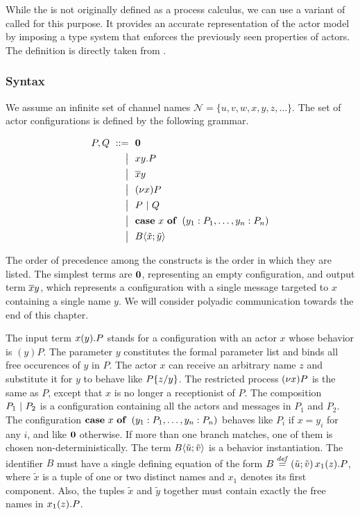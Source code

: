 While the \actormodel is not originally defined as a process calculus,
we can use a variant of \picalc called \actorpicalc for this purpose.
It provides an accurate representation of the actor model
by imposing a type system that enforces the previously seen properties of actors.
The definition is directly taken from \cite{agha_algebraic_2004}.

\subsubsection{Syntax}

We assume an infinite set of channel names
$ \mathcal{N} = \{u, v, w, x, y, z, \ldots\} $.
The set of actor configurations is defined by the following grammar.

\begin{align*}
  P, Q
  \grmr \anullproc
  \altn \amrcv{x}{y} . P
  \altn \amsnd{x}{y}
  \altn \anew{x}{P}
  \altn P \apar Q
  \altn \acse{x}{\aalt{y_1}{P_1}, \dots, \aalt{y_n}{P_n}}
  \altn \ains{B}{\tilde{x}}{\tilde{y}}
\end{align*}

The order of precedence among the constructs is the order in which they are
listed.
The simplest terms are $\textbf{\textup{0}}$, representing an empty configuration,
and output term $\overline{x} y$, which represents a configuration with a single message
targeted to $x$ containing a single name $y$. %
We will consider polyadic communication towards the end of this chapter.

The input term $x(y) . P$ stands for a configuration with an actor
$x$ whose behavior is $(y) P$.
The parameter $y$ constitutes the formal parameter list and binds all
free occurences of $y$ in $P$.
The actor $x$ can receive an arbitrary name $z$
and substitute it for $y$ to behave like $P \{ z / y \}$.
The restricted process $\anew{x}{P}$ is the same as $P$,
except that $x$ is no longer a receptionist of $P$.
The composition $P_1 \ |\  P_2$ is a configuration containing
all the actors and messages in $P_1$ and $P_2$.
The configuration
$\acse{x}{\aalt{y_1}{P_1}, \ldots, \aalt{y_n}{P_n}}$
behaves like $P_i$ if $x = y_i$ for any $i$,
and like $\textbf{\textup{0}}$ otherwise.
If more than one branch matches, one of them is chosen non-deterministically.
The term $B \langle \tilde{u} ; \tilde{v} \rangle$ is a behavior instantiation.
The identifier $B$ must have a single defining equation of the form
$\adef{B}{\tilde{u}}{\tilde{v}}{\arcv{x_1}{z} . P}$,
where $\tilde{x}$ is a tuple of one or two distinct names
and $x_1$ denotes its first component.
Also, the tuples $\tilde{x}$ and $\tilde{y}$ together must contain
exactly the free names in $x_1(z) . P$.


